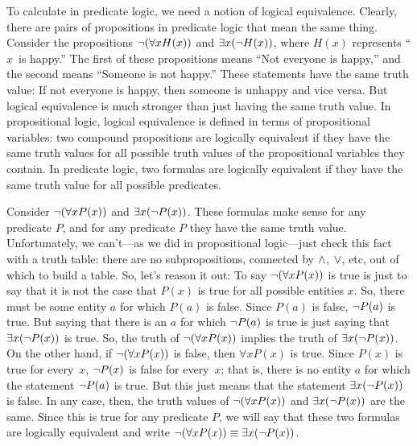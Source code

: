 To calculate in predicate logic, we need a notion of logical equivalence.
Clearly, there are pairs of propositions in predicate logic that mean the same
thing.  Consider the propositions $\lnot(\forall x H(x))$ and $\exists x(\lnot H(x))$, where
$H(x)$ represents ``$x$~is happy.'' The first of these propositions means
``Not everyone is happy,'' and the second means ``Someone is not happy.''
These statements have the same truth value:  If not everyone is happy, then someone is
unhappy and vice versa.  But logical equivalence is much stronger than just
having the same truth value.  In propositional logic, logical equivalence
is defined in terms of propositional variables:  two compound propositions
are logically equivalent if they have the same truth values for all possible
truth values of the propositional variables they contain.  In predicate logic, two
formulas are logically equivalent
if they have the same truth value for all
possible predicates.

Consider $\lnot(\forall x P(x))$ and $\exists x(\lnot P(x))$.
These formulas make
sense for any predicate $P$, and for any predicate $P$ they have the same truth
value.  Unfortunately, we can't---as we did in propositional logic---just check
this fact with a truth table: there are no subpropositions, connected by
$\wedge$, $\vee$, etc, out of which to build a table.  So, let's reason it out:
To say $\lnot(\forall x P(x))$ is true is just to say that it is not the case that
$P(x)$ is true for all possible entities $x$.  So, there must be some entity $a$
for which $P(a)$ is false.  Since $P(a)$ is false, $\lnot P(a)$ is true.
But saying that there is an $a$ for which $\lnot P(a)$ is true is just saying
that $\exists x(\lnot P(x))$ is true.  So, the truth of $\lnot(\forall x P(x))$
implies the truth of $\exists x (\lnot P(x))$.  On the other hand, if 
$\lnot(\forall x P(x))$ is false, then $\forall x P(x)$ is true.  Since $P(x)$
is true for every~$x$, $\lnot P(x)$ is false for every~$x$; that is, there is no
entity $a$ for which the statement $\lnot P(a)$ is true.
But this just means that the statement $\exists x(\lnot P(x))$
is false.  In any case, then, the truth values of $\lnot(\forall x P(x))$ and
$\exists x(\lnot P(x))$ are the same.  Since this is true for any predicate $P$,
we will say that these two formulas are logically equivalent and write
$\lnot(\forall x P(x)) \equiv \exists x(\lnot P(x))$.


